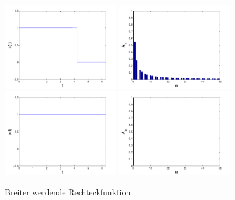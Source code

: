 \begin{refsection}
\begin{figure}
\includegraphics[width=0.45\textwidth]{kugel/Dkonstant/Rechteck3_1.pdf}
\includegraphics[width=0.45\textwidth]{kugel/Dkonstant/Rechteck3_2.pdf}
\includegraphics[width=0.45\textwidth]{kugel/Dkonstant/Rechteck4_1.pdf}
\includegraphics[width=0.45\textwidth]{kugel/Dkonstant/Rechteck4_2.pdf}
\caption{Breiter werdende Rechteckfunktion
\label{skript:Dirac1}}
\end{figure}


\end{refsection}
